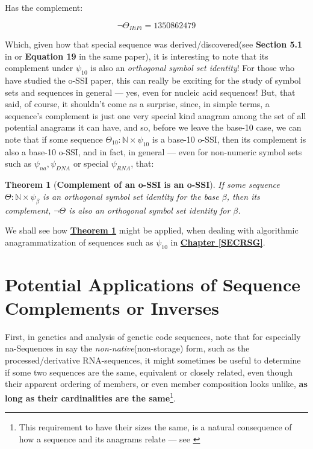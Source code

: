 \documentclass[a4paper, 18pt]{book} %
\newtheorem{theo}{Theorem}
\begin{document}
Has the complement:


\begin{equation}
\lnot\Theta_{HiFi} = 1 3 5 0 8 6 2 4 7 9
\end{equation}

Which, given how that special sequence was derived/discovered(see \textbf{Section 5.1} in \cite{ossipaper} or \textbf{Equation 19} in the same paper), it is interesting to note that its complement under $\psi_{10}$ is also an \textit{orthogonal symbol set identity}! For those who have studied the o-SSI paper\cite{ossipaper}, this can really be exciting for the study of symbol sets and sequences in general --- yes, even for nucleic acid sequences! But, that said, of course, it shouldn't come as a surprise, since, in simple terms, a sequence's complement is just one very special kind anagram among the set of all potential anagrams it can have, and so, before we leave the base-10 case, we can note that if some sequence $\Theta_{10}: \mathbb{N} \times \psi_{10}$ is a base-10 o-SSI, then its complement is also a base-10 o-SSI, and in fact, in general --- even for non-numeric symbol sets such as $\psi_{na}, \psi_{DNA}$ or special $\psi_{RNA}$, that:\\


\begin{theo}[\textbf{Complement of an o-SSI is an o-SSI}]
\label{THEOCOMPLOSSI}
If some sequence $\Theta: \mathbb{N} \times \psi_\beta$ is an orthogonal symbol set identity for the base $\beta$, then its complement, $\lnot\Theta$ is also an orthogonal symbol set identity for $\beta$.\\
\end{theo}

We shall see how \textbf{\hyperref[THEOCOMPLOSSI]{Theorem  \ref{THEOCOMPLOSSI}}} might be applied, when dealing with algorithmic anagrammatization of sequences such as $\psi_{10}$ in \textbf{\hyperref[SECRSG]{Chapter \ref{SECRSG}}}.

\section{Potential Applications of Sequence Complements or Inverses}
\label{SECAPPCOMPLEMENTS}

First, in genetics and analysis of genetic code sequences, note that for especially na-Sequences in say the \textit{non-native}(non-storage) form, such as the processed/derivative RNA-sequences, it might sometimes be useful to determine if some two sequences are the same, equivalent or closely related, even though their apparent ordering of members, or even member composition looks unlike, \textbf{as long as their cardinalities are the same}\footnote{This requirement to have their sizes the same, is a natural consequence of how a sequence and its anagrams relate --- see \cite{adtpaper}}.
\end{document}
